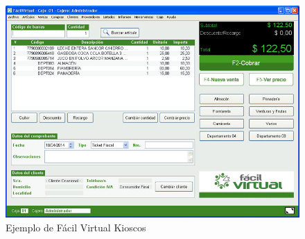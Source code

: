 \documentclass[twoside]{article}
\begin{document}
\begin{figure}[!h]
    \centering
    \includegraphics[scale=0.3]{facilvirtual.jpg}
    \caption{Ejemplo de Fácil Virtual Kioscos}
    \label{fig:enter-label}
\end{figure}
\end{document}
